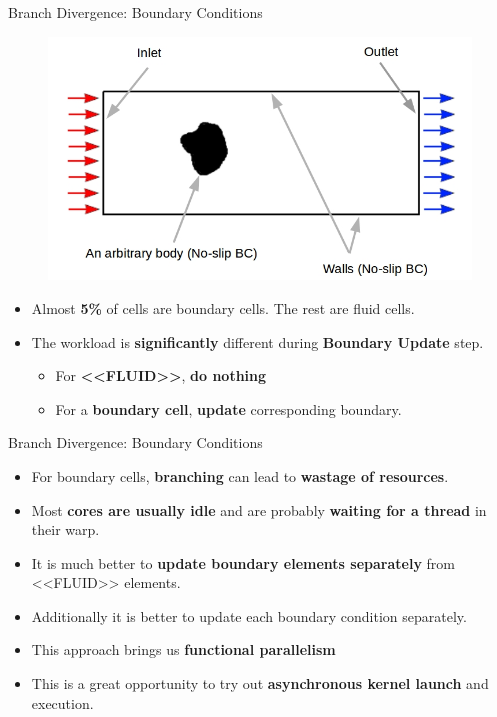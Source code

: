\documentclass[9pt]{beamer}
\begin{document}
\begin{frame}[t]{Branch Divergence: Boundary Conditions}
\begin{figure}
	\includegraphics[scale=0.3]{images/wind-tunnel.jpg}
	\centering
\end{figure}

\begin{itemize}
\item Almost \textbf{5\%} of cells are boundary cells. The rest are fluid cells.

\item The workload is \textbf{significantly} different during \textbf{Boundary Update} step.
\medskip
	\begin{itemize}
	\item For \textbf{<<FLUID>>}, \textbf{do nothing}
	\item For a \textbf{boundary cell}, \textbf{update} corresponding boundary.
	\end{itemize}
\end{itemize}
\end{frame}


\begin{frame}[t]{Branch Divergence: Boundary Conditions}
\begin{itemize}
\item For boundary cells, \textbf{branching} can lead to \textbf{wastage of resources}.
\medskip
\item Most \textbf{cores are usually idle} and are probably \textbf{waiting for a thread} in their warp.
\medskip
\item It is much better to \textbf{update boundary elements separately} from <<FLUID>> elements.
\smallskip
\item Additionally it is better to update each boundary condition separately.
\medskip
\item This approach brings us \textbf{functional parallelism}
\medskip
\item This is a great opportunity to try out \textbf{asynchronous kernel launch} and execution. 
\end{itemize}
\end{frame}
\end{document}
